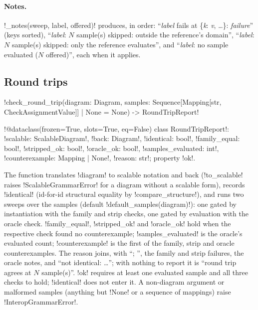 \paragraph{Notes.} \py!_notes(sweep, label, offered)! produces, in order: ``\textit{label} fails at \{\textit{k}: \textit{v}, \ldots\}: \textit{failure}'' (keys sorted), ``\textit{label}: $N$ sample(s) skipped: outside the reference's domain'', ``\textit{label}: $N$ sample(s) skipped: only the reference evaluates'', and ``\textit{label}: no sample evaluated ($N$ offered)'', each when it applies.

\subsection{Round trips}

\begin{signature}
\py!check_round_trip(diagram: Diagram, samples: Sequence[Mapping[str, CheckAssignmentValue]] | None = None) -> RoundTripReport!

\py!@dataclass(frozen=True, slots=True, eq=False) class RoundTripReport!: \py!scalable: ScalableDiagram!, \py!back: Diagram!, \py!identical: bool!, \py!family_equal: bool!, \py!stripped_ok: bool!, \py!oracle_ok: bool!, \py!samples_evaluated: int!, \py!counterexample: Mapping | None!, \py!reason: str!; property \py!ok!.
\end{signature}

\noindent The function translates \py!diagram! to scalable notation and back (\py!to_scalable! raises \py!ScalableGrammarError! for a diagram without a scalable form), records \py!identical! (id-for-id structural equality by \py!compare_structure!), and runs two sweeps over the samples (default \py!default_samples(diagram)!): one gated by instantiation with the family and strip checks, one gated by evaluation with the oracle check. \py!family_equal!, \py!stripped_ok! and \py!oracle_ok! hold when the respective check found no counterexample; \py!samples_evaluated! is the oracle's evaluated count; \py!counterexample! is the first of the family, strip and oracle counterexamples. The reason joins, with ``; '', the family and strip failures, the oracle notes, and ``not identical: \ldots''; with nothing to report it is ``round trip agrees at $N$ sample(s)''. \py!ok! requires at least one evaluated sample and all three checks to hold; \py!identical! does not enter it. A non-diagram argument or malformed samples (anything but \py!None! or a sequence of mappings) raise \py!InteropGrammarError!.

